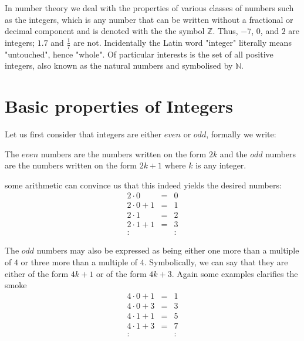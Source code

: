 



In number theory we deal with the properties of various classes of numbers such
as the integers, which is any number that can be written without a fractional
or decimal component and is denoted with the the symbol $\mathbb{Z}$. Thus,
$-7$, $0$, and $2$ are integers; $1.7$ and $\frac{1}{7}$ are not. Incidentally
the Latin word "integer" literally means "untouched", hence "whole". Of
particular interests is the set of all positive integers, also known as the
natural numbers and symbolised by $\mathbb{N}$.

\section{Basic properties of Integers}
Let us first consider that integers are either $even$ or $odd$, formally we
write:
\begin{definition}\label{num_def}
The $even$ numbers are the numbers written on the form $2k$ and the $odd$ numbers are the numbers written on the form $2k+1$ where $k$ is any integer.
\end{definition}
some arithmetic can convince us that this indeed yields the desired numbers:
\[
\begin{array}{lcl}
2 \cdot 0     & = & 0 \\
2 \cdot 0 + 1 & = & 1 \\
2 \cdot 1     & = & 2 \\
2 \cdot 1 + 1 & = & 3 \\
:             &   & :
\end{array}
\]

The $odd$ numbers may also be expressed as being either one more than a
multiple of $4$ or three more than a multiple of $4$. Symbolically, we can say
that they are either of the form $4k + 1$ or of the form $4k  + 3$. Again some
examples clarifies the smoke
\[
\begin{array}{lcl}
4 \cdot 0 + 1 & = & 1 \\
4 \cdot 0 + 3 & = & 3 \\
4 \cdot 1 + 1 & = & 5 \\
4 \cdot 1 + 3 & = & 7 \\
:             &   & :
\end{array}
\]


